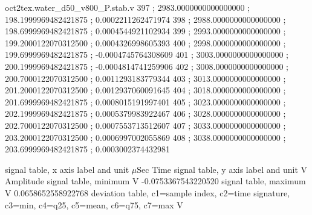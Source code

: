 \begin{filecontents}[overwrite]{oct2tex.water_d50_v800_P.stab.v}
397 ; 2983.0000000000000000 ; 198.1999969482421875 ; 0.0002211262471974
398 ; 2988.0000000000000000 ; 198.6999969482421875 ; 0.0004544921102934
399 ; 2993.0000000000000000 ; 199.2000122070312500 ; 0.0004326998605393
400 ; 2998.0000000000000000 ; 199.6999969482421875 ; -0.0004745764308609
401 ; 3003.0000000000000000 ; 200.1999969482421875 ; -0.0004814741259906
402 ; 3008.0000000000000000 ; 200.7000122070312500 ; 0.0011293183779344
403 ; 3013.0000000000000000 ; 201.2000122070312500 ; 0.0012937060091645
404 ; 3018.0000000000000000 ; 201.6999969482421875 ; 0.0008015191997401
405 ; 3023.0000000000000000 ; 202.1999969482421875 ; 0.0005379983922467
406 ; 3028.0000000000000000 ; 202.7000122070312500 ; 0.0007553713512607
407 ; 3033.0000000000000000 ; 203.2000122070312500 ; 0.0006997002055869
408 ; 3038.0000000000000000 ; 203.6999969482421875 ; 0.0003002374432981
\end{filecontents}
\expandafter\def\csname oct2tex.water_d50_v800_P.stabxlbl.d\endcsname{signal table, x axis label and unit}
\expandafter\def\csname oct2tex.water_d50_v800_P.stabxlbl.u\endcsname{\ensuremath{\mu\text{Sec}}}
\expandafter\def\csname oct2tex.water_d50_v800_P.stabxlbl.v\endcsname{Time}
\expandafter\def\csname oct2tex.water_d50_v800_P.stabylbl.d\endcsname{signal table, y axis label and unit}
\expandafter\def\csname oct2tex.water_d50_v800_P.stabylbl.u\endcsname{\ensuremath{\text{V}}}
\expandafter\def\csname oct2tex.water_d50_v800_P.stabylbl.v\endcsname{Amplitude}
\expandafter\def\csname oct2tex.water_d50_v800_P.stabmin.d\endcsname{signal table, minimum}
\expandafter\def\csname oct2tex.water_d50_v800_P.stabmin.u\endcsname{\ensuremath{\text{V}}}
\expandafter\def\csname oct2tex.water_d50_v800_P.stabmin.v\endcsname{-0.0753367543220520}
\expandafter\def\csname oct2tex.water_d50_v800_P.stabmax.d\endcsname{signal table, maximum}
\expandafter\def\csname oct2tex.water_d50_v800_P.stabmax.u\endcsname{\ensuremath{\text{V}}}
\expandafter\def\csname oct2tex.water_d50_v800_P.stabmax.v\endcsname{0.0658652558922768}
\expandafter\def\csname oct2tex.water_d50_v800_P.dtab.d\endcsname{deviation table, c1=sample index, c2=time signature, c3=min, c4=q25, c5=mean, c6=q75, c7=max}
\expandafter\def\csname oct2tex.water_d50_v800_P.dtab.u\endcsname{\ensuremath{\text{V}}}
